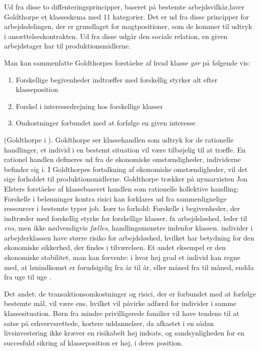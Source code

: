 Ud fra disse to diffenteringsprincipper, baseret på bestemte arbejdsvilkår,laver Goldthorpe et klasseskema med 11 kategorier. Det er ud fra disse principper for arbejdsdelingen, der er grundlaget for magtpositioner, som de kommer til udtryk i ansættelseskontrakten. Ud fra disse udgår den sociale relation, en given arbejdstager har til produktionsmidlerne. %

Man kan sammenfatte Goldthorpes forståelse af hvad klasse \emph{gør} på følgende vis: 
%
\begin{enumerate}
 \itemsep-0.3em 		
 	\item Forskellige begivenheder indtræffer med forskellig styrker alt efter klasseposition
 	\item Forskel i interessedrejning hos forskellige klasser
 	\item Omkostninger forbundet med at forfølge en given interesse
\end{enumerate}
%
(Goldthorpe i \parencite[93]{Harrits2014}). Goldthorpe ser klassehandlen som  udtryk for de rationelle handlinger, et individ i en bestemt situation vil være tilbøjelig til at træffe. En rationel handlen defineres ud fra de økonomiske omstændigheder, individerne befinder sig i. I Goldthorpes fortolkning af økonomiske omstændigheder, vil det sige forholdet til produktionsmidlerne. Goldthorpe trækker på nymarxisten Jon Elsters forståelse af klassebaseret handlen som rationelle kollektive handling: Forskelle i belønninger kontra risici kan forklares ud fra sammenlignelige ressourcer i bestemte typer job. Især to forhold: Forskelle i begivenheder, der indtræder med forskellig styrke for forskellige klasser, fx arbejdsløshed, leder til \emph{ens}, men ikke nødvendigvis \emph{fælles}, handlingsmønstre indenfor klassen. individer i arbejderklassen have større risiko for arbejdsløshed, hvilket har betydning for den økonomiske sikkerhed, der findes i tilværelsen. Et andet eksempel er den økonomiske stabilitet, man kan forvente: i hvor høj grad et individ kan regne med, at lønindkomst er forudsigelig fra år til år, eller måned fra til måned, endda fra uge til uge \parencite[6, 10]{GoldthorpeMcKnight2004}.

Det andet: de transaktionsomkostninger og risici, der er forbundet med at forfølge bestemte mål, vil være ens, hvilket vil påvirke adfærd for individer i samme klassesituation. Børn fra mindre privilligerede familier vil have tendens til at satse på erhvervsrettede, kortere uddannelser, da afkastet i en sådan livsinvestering ikke kræver en risikabelt høj indsats, og sandsynligheden for en succesfuld sikring af klasseposition er høj, i deres position. 

